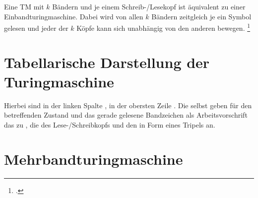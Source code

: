 \documentclass{lehramt-informatik-haupt}
\begin{document}
Eine TM mit $k$ Bändern und je einem Schreib-/Lesekopf ist
äquivalent zu einer Einbandturingmaschine. Dabei wird von allen $k$
Bändern zeitgleich je ein Symbol gelesen und jeder der $k$ Köpfe
kann sich unabhängig von den anderen bewegen.
\footcite[Seite 26]{theo:fs:3}

\section{Tabellarische Darstellung der Turingmaschine}

Hierbei sind in der linken Spalte , in der obersten Zeile . Die  selbst geben für den
betreffenden Zustand und das gerade gelesene Bandzeichen als
Arbeitsvorschrift das zu , die
 des Lese-/Schreibkopfs und den 
in Form eines Tripels an.


\section{Mehrbandturingmaschine}

\literatur
\end{document}
